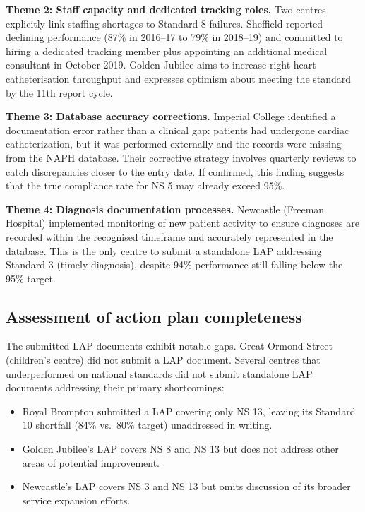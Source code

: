 \documentclass[11pt,a4paper]{article}
\begin{document}
\textbf{Theme 2: Staff capacity and dedicated tracking roles.} Two centres explicitly link staffing shortages to Standard 8 failures. Sheffield reported declining performance (87\% in 2016--17 to 79\% in 2018--19) and committed to hiring a dedicated tracking member plus appointing an additional medical consultant in October 2019. Golden Jubilee aims to increase right heart catheterisation throughput and expresses optimism about meeting the standard by the 11th report cycle.

\textbf{Theme 3: Database accuracy corrections.} Imperial College identified a documentation error rather than a clinical gap: patients had undergone cardiac catheterization, but it was performed externally and the records were missing from the NAPH database. Their corrective strategy involves quarterly reviews to catch discrepancies closer to the entry date. If confirmed, this finding suggests that the true compliance rate for NS 5 may already exceed 95\%.

\textbf{Theme 4: Diagnosis documentation processes.} Newcastle (Freeman Hospital) implemented monitoring of new patient activity to ensure diagnoses are recorded within the recognised timeframe and accurately represented in the database. This is the only centre to submit a standalone LAP addressing Standard 3 (timely diagnosis), despite 94\% performance still falling below the 95\% target.

\subsection{Assessment of action plan completeness}

The submitted LAP documents exhibit notable gaps. Great Ormond Street (children's centre) did not submit a LAP document. Several centres that underperformed on national standards did not submit standalone LAP documents addressing their primary shortcomings:

\begin{itemize}[nosep]
    \item Royal Brompton submitted a LAP covering only NS 13, leaving its Standard 10 shortfall (84\% vs.\ 80\% target) unaddressed in writing.
    \item Golden Jubilee's LAP covers NS 8 and NS 13 but does not address other areas of potential improvement.
    \item Newcastle's LAP covers NS 3 and NS 13 but omits discussion of its broader service expansion efforts.
\end{itemize}
\end{document}

